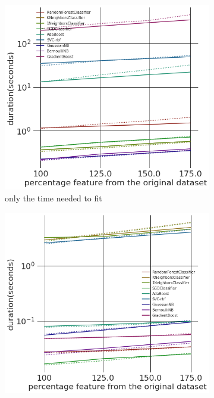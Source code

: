 \documentclass[a4paper,10pt]{article}
\begin{document}
\begin{figure}[H]
	\centering	
	\begin{subfigure}[b]{0.45\textwidth}
		\includegraphics[width=\textwidth]{images/appendix/FeatAddDupRandPredClass.png}
		\caption{only the time needed to fit }
		\label{fig:SADRC2}
	\end{subfigure}
	\begin{subfigure}[b]{0.45\textwidth}
		\includegraphics[width=\textwidth]{images/appendix/FeatAddDupRandPred.png}

\end{subfigure}
\end{figure}
\end{document}
